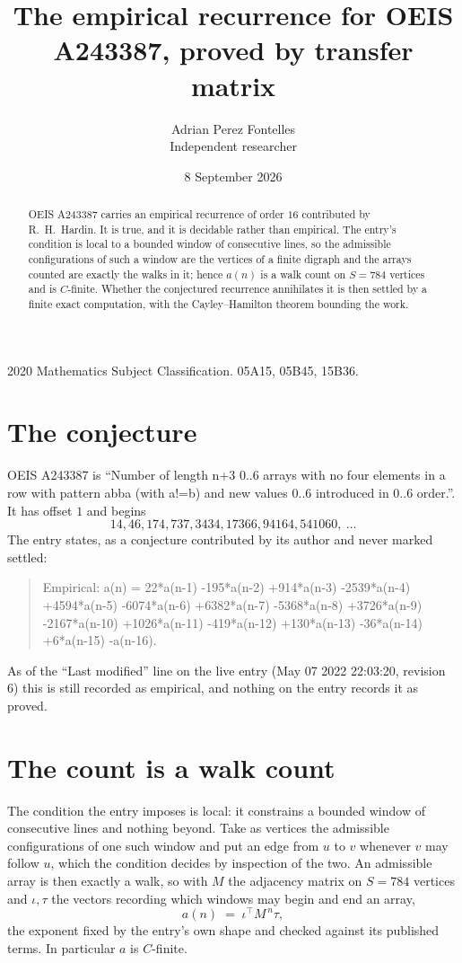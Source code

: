 \documentclass[11pt,a4paper]{article}
\title{The empirical recurrence for OEIS A243387, proved by transfer matrix}
\author{Adrian Perez Fontelles\\ \small Independent researcher}
\date{8 September 2026}
\theoremstyle{plain}
\theoremstyle{definition}
\begin{document}
\maketitle

\begin{abstract}
OEIS A243387 carries an empirical recurrence of order $16$ contributed by R.~H.~Hardin. It is
true, and it is decidable rather than empirical. The entry's condition is local to a bounded window of consecutive lines, so
the admissible configurations of such a window are the vertices of a finite digraph and the
arrays counted are exactly the walks in it; hence $a(n)$ is a walk count on $S=784$ vertices
and is $C$-finite. Whether the conjectured recurrence annihilates it is then settled by a
finite exact computation, with the Cayley--Hamilton theorem bounding the work.
\end{abstract}

\noindent\small 2020 Mathematics Subject Classification. 05A15, 05B45, 15B36.\normalsize

\section{The conjecture}

OEIS A243387 is ``Number of length n+3 0..6 arrays with no four elements in a row with pattern abba (with a!=b) and new values 0..6 introduced in 0..6 order.''. It has offset $1$ and begins
\[
14, 46, 174, 737, 3434, 17366, 94164, 541060,\ \dots
\]
The entry states, as a conjecture contributed by its author and never marked settled:
\begin{quote}
Empirical: a(n) = 22*a(n-1) -195*a(n-2) +914*a(n-3) -2539*a(n-4) +4594*a(n-5) -6074*a(n-6) +6382*a(n-7) -5368*a(n-8) +3726*a(n-9) -2167*a(n-10) +1026*a(n-11) -419*a(n-12) +130*a(n-13) -36*a(n-14) +6*a(n-15) -a(n-16).
\end{quote}
As of the ``Last modified'' line on the live entry (May 07 2022 22:03:20, revision 6) this is still
recorded as empirical, and nothing on the entry records it as proved.

\section{The count is a walk count}

The condition the entry imposes is local: it constrains a bounded window of consecutive lines and nothing beyond. Take as
vertices the admissible configurations of one such window and put an edge from $u$ to $v$
whenever $v$ may follow $u$, which the condition decides by inspection of the two. An
admissible array is then exactly a walk, so with $M$ the adjacency matrix on $S=784$ vertices
and $\iota,\tau$ the vectors recording which windows may begin and end an array,
\[
a(n)\;=\;\iota^{\!\top}M^{\,n}\tau ,
\]
the exponent fixed by the entry's own shape and checked against its published terms. In
particular $a$ is $C$-finite.
\end{document}
